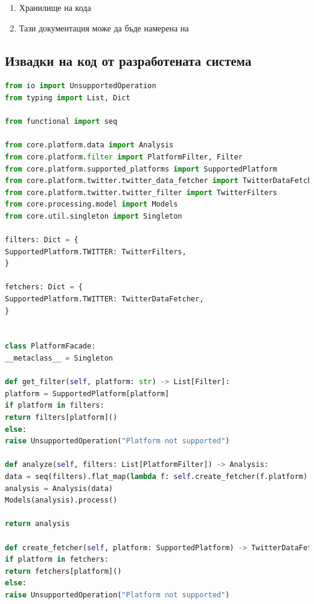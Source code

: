 \documentclass{article}
\begin{document}
\begin{enumerate}
\item Хранилище на кода
\item Тази документация може да бъде намерена на
\end{enumerate}

\subsection{Извадки на код от разработената система}

\begin{lstlisting}[language=Python, caption=core.platform.platform\_facade]
from io import UnsupportedOperation
from typing import List, Dict

from functional import seq

from core.platform.data import Analysis
from core.platform.filter import PlatformFilter, Filter
from core.platform.supported_platforms import SupportedPlatform
from core.platform.twitter.twitter_data_fetcher import TwitterDataFetcher
from core.platform.twitter.twitter_filter import TwitterFilters
from core.processing.model import Models
from core.util.singleton import Singleton

filters: Dict = {
SupportedPlatform.TWITTER: TwitterFilters,
}

fetchers: Dict = {
SupportedPlatform.TWITTER: TwitterDataFetcher,
}


class PlatformFacade:
__metaclass__ = Singleton

def get_filter(self, platform: str) -> List[Filter]:
platform = SupportedPlatform[platform]
if platform in filters:
return filters[platform]()
else:
raise UnsupportedOperation("Platform not supported")

def analyze(self, filters: List[PlatformFilter]) -> Analysis:
data = seq(filters).flat_map(lambda f: self.create_fetcher(f.platform).fetch(f.filters)).distinct().to_list()
analysis = Analysis(data)
Models(analysis).process()

return analysis

def create_fetcher(self, platform: SupportedPlatform) -> TwitterDataFetcher:
if platform in fetchers:
return fetchers[platform]()
else:
raise UnsupportedOperation("Platform not supported")
\end{lstlisting}
\end{document}

